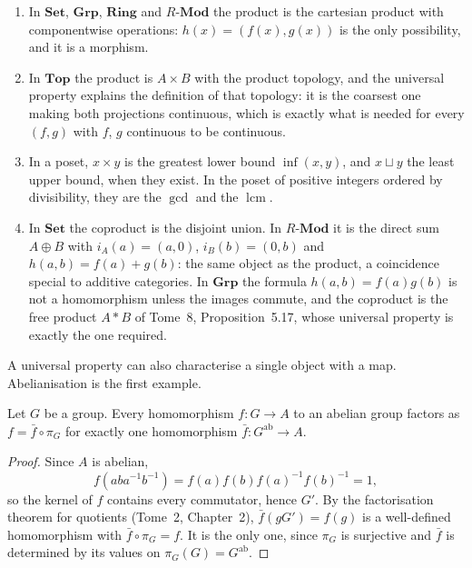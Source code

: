 \begin{example}\label{ex:products}
\leavevmode
\begin{enumerate}[label=(\alph*)]
\item In $\mathbf{Set}$, $\mathbf{Grp}$, $\mathbf{Ring}$ and $R\text{-}\mathbf{Mod}$ the product is the cartesian product with componentwise operations: $h(x)=(f(x),g(x))$ is the only possibility, and it is a
morphism.
\item In $\mathbf{Top}$ the product is $A\times B$ with the product topology, and the universal property explains the definition of that topology: it is the coarsest one making both projections
continuous, which is exactly what is needed for every $(f,g)$ with $f$, $g$ continuous to be continuous.
\item In a poset, $x\times y$ is the greatest lower bound $\inf(x,y)$, and $x\sqcup y$ the least upper bound, when they exist. In the poset of positive integers ordered by divisibility, they are the
$\gcd$ and the $\operatorname{lcm}$.
\item In $\mathbf{Set}$ the coproduct is the disjoint union. In $R\text{-}\mathbf{Mod}$ it is the direct sum $A\oplus B$ with $i_A(a)=(a,0)$, $i_B(b)=(0,b)$ and $h(a,b)=f(a)+g(b)$: the same object as the product,
a coincidence special to additive categories. In $\mathbf{Grp}$ the formula $h(a,b)=f(a)g(b)$ is not a homomorphism unless the images commute, and the coproduct is the free product $A*B$ of Tome~8,
Proposition~5.17, whose universal property is exactly the one required.
\end{enumerate}
\end{example}

A universal property can also characterise a single object with a map. Abelianisation is the first example.

\begin{proposition}\label{prop:abuniv}
Let $G$ be a group. Every homomorphism $f\colon G\to A$ to an abelian group factors as $f=\bar f\circ\pi_G$ for exactly one homomorphism $\bar f\colon G^{\mathrm{ab}}\to A$.
\end{proposition}

\begin{proof}
Since $A$ is abelian,
\[f(aba^{-1}b^{-1})=f(a)f(b)f(a)^{-1}f(b)^{-1}=1,\]
so the kernel of $f$ contains every commutator, hence $G'$. By the factorisation theorem for quotients (Tome~2, Chapter~2), $\bar f(gG')=f(g)$ is a
well-defined homomorphism with $\bar f\circ\pi_G=f$. It is the only one, since $\pi_G$ is surjective and $\bar f$ is determined by its values on $\pi_G(G)=G^{\mathrm{ab}}$.
\end{proof}

